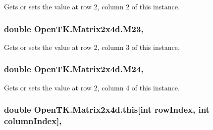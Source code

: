 Gets or sets the value at row 2, column 2 of this instance. 

\hypertarget{struct_open_t_k_1_1_matrix2x4d_ae5b70efcca57ecfb2c7da1f19aaad105}{
\subsubsection[{M23}]{\setlength{\rightskip}{0pt plus 5cm}double Open\-T\-K.\-Matrix2x4d.\-M23\hspace{0.3cm}{\ttfamily [get]}, {\ttfamily [set]}}}\label{struct_open_t_k_1_1_matrix2x4d_ae5b70efcca57ecfb2c7da1f19aaad105}


Gets or sets the value at row 2, column 3 of this instance. 

\hypertarget{struct_open_t_k_1_1_matrix2x4d_a48a33c90ec140be681b04153a81e99c9}{
\subsubsection[{M24}]{\setlength{\rightskip}{0pt plus 5cm}double Open\-T\-K.\-Matrix2x4d.\-M24\hspace{0.3cm}{\ttfamily [get]}, {\ttfamily [set]}}}\label{struct_open_t_k_1_1_matrix2x4d_a48a33c90ec140be681b04153a81e99c9}


Gets or sets the value at row 2, column 4 of this instance. 

\hypertarget{struct_open_t_k_1_1_matrix2x4d_a89ae4635cbac9bcce42f80f0d02d11d8}{
\subsubsection[{this[int row\-Index, int column\-Index]}]{\setlength{\rightskip}{0pt plus 5cm}double Open\-T\-K.\-Matrix2x4d.\-this\mbox{[}int row\-Index, int column\-Index\mbox{]}\hspace{0.3cm}{\ttfamily [get]}, {\ttfamily [set]}}}\label{struct_open_t_k_1_1_matrix2x4d_a89ae4635cbac9bcce42f80f0d02d11d8}


